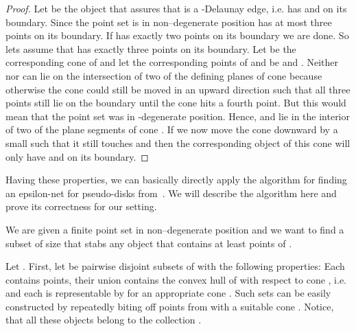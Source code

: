 \documentclass{stacs_proc}
\begin{document}
\begin{proof}
  Let  be the object that assures that  is a -Delaunay
  edge, i.e.  has  and  on its boundary. Since the point set
   is in non--degenerate position  has at most three points
  on its boundary. If  has exactly two points on its boundary we
  are done. So lets assume that  has exactly three points on its
  boundary. Let  be the corresponding cone of  and let the
  corresponding points of  and  be  and .  
  Neither  nor  can lie on the intersection of two of the
  defining planes of cone  because otherwise the cone could still
  be moved in an upward direction such that all three points still lie
  on the boundary until the cone hits a fourth point. But this would
  mean that the point set was in -degenerate position. Hence, 
  and  lie in the interior of two of the plane segments of cone
  .  
  If we now move the cone  downward by a small  such that it
  still touches  and  then the corresponding object of this
  cone will only have  and  on its boundary.  
\end{proof}


Having these properties, we can basically directly apply the algorithm
for finding an epsilon-net for pseudo-disks  
from~\cite{MSW90}. We will describe the algorithm here and prove its
correctness for our setting. 

We are given a finite point set  in non--degenerate position
and we want to find a subset  of size  that stabs
any object  that contains at least  points of . 

Let . First, let  be pairwise disjoint subsets of
 with the following properties: Each  contains  points,
their union contains the convex hull of  with respect to cone ,
i.e.  and each  is representable by
 for an appropriate  cone . Such sets can be easily
constructed by repeatedly biting off points from  with a
suitable cone . Notice, that all these objects 
belong to the collection .  
\end{document}
